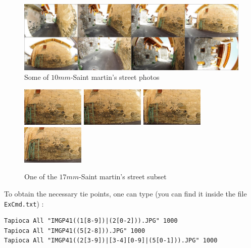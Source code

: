 \begin{figure}
\begin{center}
\includegraphics[width=150mm]{FIGS/StreetSainMartin/Planche-Rue.jpg}
\end{center}
\caption{Some of $10mm$-Saint martin's street photos}
\label{FIG:StM:Rue}
\end{figure}


\begin{figure}
\begin{center}
\includegraphics[width=30mm]{FIGS/StreetSainMartin/Small-IMGP4148.JPG}
\includegraphics[width=30mm]{FIGS/StreetSainMartin/Small-IMGP4149.JPG}
\includegraphics[width=30mm]{FIGS/StreetSainMartin/Small-IMGP4150.JPG}
\includegraphics[width=30mm]{FIGS/StreetSainMartin/Small-IMGP4151.JPG}
\end{center}
\caption{One of the  $17mm$-Saint martin's street subset}
\label{FIG:StM:StrConv}
\end{figure}


To obtain the necessary tie points, one can type (you can find it
inside the file {\tt ExCmd.txt}) :


\begin{verbatim}
Tapioca All "IMGP41((1[8-9])|(2[0-2])).JPG" 1000
Tapioca All "IMGP41((5[2-8])).JPG" 1000
Tapioca All "IMGP41((2[3-9])|[3-4][0-9]|(5[0-1])).JPG" 1000
\end{verbatim}



